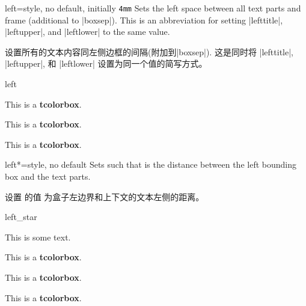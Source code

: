 \begin{docTcbKey}{left}{=}{style, no default, initially \texttt{4mm}}
  Sets the left space between all text parts and frame (additional to |boxsep|).
  This is an abbreviation for setting
  |lefttitle|, |leftupper|, and |leftlower| to the same value.

设置所有的文本内容同左侧边框的间隔(附加到|boxsep|).
这是同时将 |lefttitle|, |leftupper|, 和 |leftlower| 设置为同一个值的简写方式。
\begin{exdispExample}{left}

\begin{tcolorbox}
  This is a \textbf{tcolorbox}.
  \end{tcolorbox}

\begin{tcolorbox}[left=0mm]
This is a \textbf{tcolorbox}.
\end{tcolorbox}

\begin{tcolorbox}[left=10mm]
This is a \textbf{tcolorbox}.
\end{tcolorbox}
\end{exdispExample}
\end{docTcbKey}

\begin{docTcbKey}[][doc new=2017-02-16]{left*}{=}{style, no default}
  Sets  such that  is the distance between
  the left bounding box and the text parts.

设置  的值  为盒子左边界和上下文的文本左侧的距离。

\begin{exdispExample}{left_star}

This is some text.
\begin{tcolorbox}[grow to left by=5mm,left*=0mm,
  enhanced,show bounding box]
This is a \textbf{tcolorbox}.
\end{tcolorbox}

\begin{tcolorbox}[left*=0mm,
  enhanced,show bounding box]
This is a \textbf{tcolorbox}.
\end{tcolorbox}

\begin{tcolorbox}
This is a \textbf{tcolorbox}.
\end{tcolorbox}
\end{exdispExample}
\end{docTcbKey}




